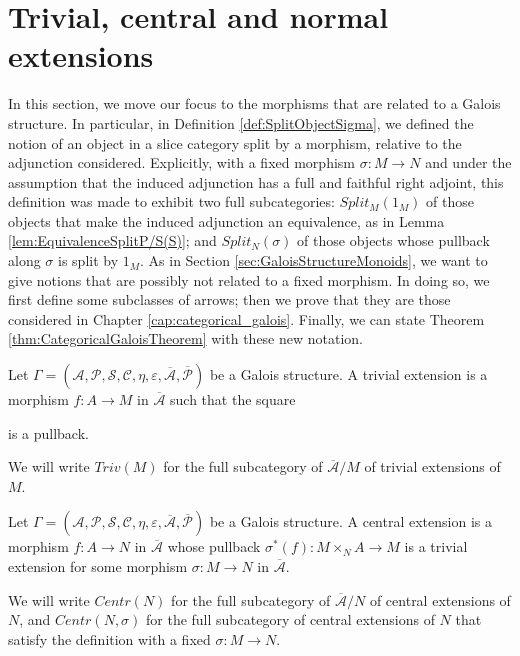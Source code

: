 \section{Trivial, central and normal extensions}
\label{sec:Extensions}

In this section, we move our focus to the morphisms that are related to a Galois structure. In particular, in Definition \ref{def:SplitObjectSigma}, we defined the notion of an object in a slice category split by a morphism, relative to the adjunction considered. Explicitly, with a fixed morphism $\sigma:M\to N$ and under the assumption that the induced adjunction has a full and faithful right adjoint, this definition was made to exhibit two full subcategories: $Split_M(1_M)$ of those objects that make the induced adjunction an equivalence, as in Lemma \ref{lem:EquivalenceSplitP/S(S)}; and $Split_N(\sigma)$ of those objects whose pullback along $\sigma$ is split by $1_M$. As in Section \ref{sec:GaloisStructureMonoids}, we want to give notions that are possibly not related to a fixed morphism. In doing so, we first define some subclasses of arrows; then we prove that they are those considered in Chapter \ref{cap:categorical_galois}. Finally, we can state Theorem \ref{thm:CategoricalGaloisTheorem} with these new notation.
\begin{definition}
    Let $\Gamma = (\mathcal{A}, \mathcal{P}, \mathcal{S}, \mathcal{C}, \eta, \varepsilon, \overline{\mathcal{A}}, \overline{\mathcal{P}})$ be a Galois structure. A trivial extension is a morphism $f:A\to M$ in $\overline{\mathcal{A}}$ such that the square
    \begin{center}
    \end{center}
    is a pullback.
    
    We will write $Triv(M)$ for the full subcategory of $\overline{\mathcal{A}}/M$ of trivial extensions of $M$.
\end{definition}
\begin{definition}
    Let $\Gamma = (\mathcal{A}, \mathcal{P}, \mathcal{S}, \mathcal{C}, \eta, \varepsilon, \overline{\mathcal{A}}, \overline{\mathcal{P}})$ be a Galois structure. A central extension is a morphism $f:A\to N$ in $\overline{\mathcal{A}}$ whose pullback $\sigma^*(f):M\times_NA\to M$ is a trivial extension for some morphism $\sigma:M\to N$ in $\overline{\mathcal{A}}$.
    
    We will write $Centr(N)$ for the full subcategory of $\overline{\mathcal{A}}/N$ of central extensions of $N$, and $Centr(N,\sigma)$ for the full subcategory of central extensions of $N$ that satisfy the definition with a fixed $\sigma:M\to N$.
\end{definition}
